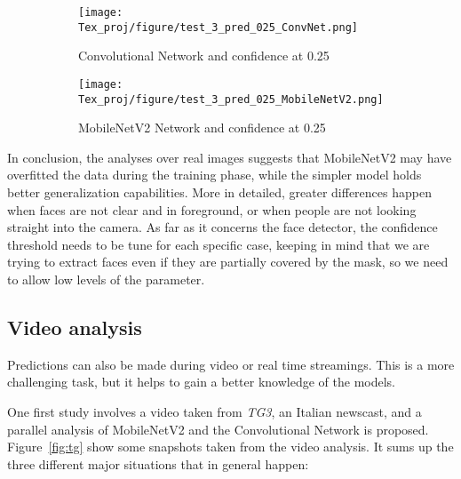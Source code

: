 \documentclass[10pt,twocolumn,letterpaper]{article}
\begin{document}
\begin{figure}[htp]
    \centering
    \begin{subfigure}[b]{0.4\textwidth}
        \centering
        \texttt{[image: Tex\_proj/figure/test\_3\_pred\_025\_ConvNet.png]}
        \caption{Convolutional Network and confidence at 0.25}
         \label{fig:conv_25_3}
    \end{subfigure}
    \begin{subfigure}[b]{0.4\textwidth}
        \centering
        \texttt{[image: Tex\_proj/figure/test\_3\_pred\_025\_MobileNetV2.png]}
        \caption{MobileNetV2 Network and confidence at 0.25}
        \label{fig:MN_25_3}
    \end{subfigure}
    \caption{}
    \label{fig:test_3}
\end{figure}


In conclusion, the analyses over real images suggests that MobileNetV2 may have overfitted the data during the training phase, while the simpler model holds better generalization capabilities. More in detailed, greater differences happen when faces are not clear and in foreground, or when people are not looking straight into the camera.
As far as it concerns the face detector, the confidence threshold needs to be tune for each specific case, keeping in mind that we are trying to extract faces even if they are partially covered by the mask, so we need to allow low levels of the parameter.

\subsection{Video analysis}
\label{sec:video}
Predictions can also be made during video or real time streamings. This is a more challenging task, but it helps to gain a better knowledge of the models. 

One first study involves a video taken from \textit{TG3}, an Italian newscast, and a parallel analysis of MobileNetV2 and the Convolutional Network is proposed. Figure~\ref{fig:tg} show some snapshots taken from the video analysis. It sums up the three different major situations that in general happen:
\end{document}
